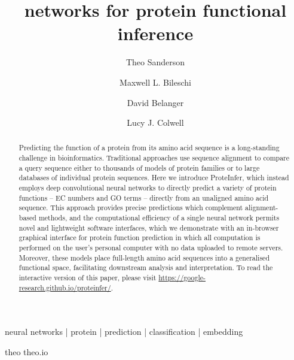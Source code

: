 \title{\DIFdelbegin {}\DIFdelend \DIFaddbegin {}\DIFaddend networks for protein functional inference}
\author[*,1,\Letter]{Theo Sanderson}
\author[*,2]{Maxwell L. Bileschi}
\author[2]{David Belanger}
\author[2]{Lucy J. Colwell}




\maketitle



\begin{abstract}
  Predicting the function of a protein from its amino acid sequence is a long-standing challenge in bioinformatics. Traditional approaches use sequence alignment to compare a query sequence either to thousands of models of protein families or to large databases of individual protein sequences. Here we introduce ProteInfer, which instead employs deep convolutional neural networks to directly predict a variety of protein functions -- EC numbers and GO terms -- directly from an unaligned amino acid sequence. This approach provides precise predictions which complement alignment-based methods, and the computational efficiency of a single neural network permits novel and lightweight software interfaces, which we demonstrate with an in-browser graphical interface for protein function prediction in which all computation is performed on the user's personal computer with no data uploaded to remote servers. Moreover, these models place full-length amino acid sequences into a generalised functional space, facilitating downstream analysis and interpretation. To read the interactive version of this paper, please visit \url{https://google-research.github.io/proteinfer/}.
\end {abstract}

\begin{keywords}
neural networks | protein | prediction | classification | embedding
\end{keywords}


\begin{corrauthor}
theo \at \;theo.io
\end{corrauthor}



